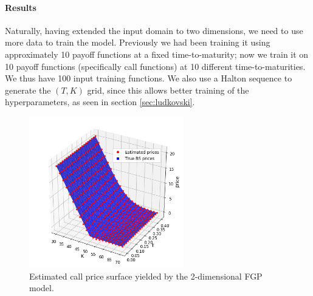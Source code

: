 \documentclass[a4paper,12pt]{article}
\begin{document}
\paragraph{Results}
Naturally, having extended the input domain to two dimensions, we need to use more data to train the model. Previously we had been training it using approximately 10 payoff functions at a fixed time-to-maturity; now we train it on 10 payoff functions (specifically call functions) at 10 different time-to-maturities. We thus have 100 input training functions. We also use a Halton sequence to generate the $(T, K)$ grid, since this allows better training of the hyperparameters, as seen in section \ref{sec:ludkovski}.\\
\begin{figure} [H]
    \centering
    \includegraphics[width=0.6\textwidth]{fgp_2d_price_surface.png}
    \caption{Estimated call price surface yielded by the 2-dimensional FGP model.}
    \label{fig:fgp_2d_price_surface}
\end{figure}
\end{document}

